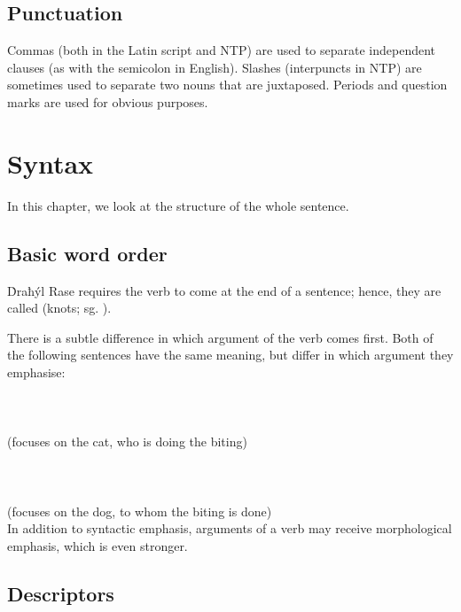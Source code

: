 \documentclass{book}
\begin{document}
\section{Punctuation}

Commas (both in the Latin script and NTP) are used to separate independent clauses (as with the semicolon in English). Slashes (interpuncts in  NTP) are sometimes used to separate two nouns that are juxtaposed. Periods and question marks are used for obvious purposes.

\chapter{Syntax}

In this chapter, we look at the structure of the whole sentence.

\section{Basic word order}

Ḋraħýl Rase requires the verb to come at the end of a sentence; hence, they are called  (knots; sg. ).

There is a subtle difference in which argument of the verb comes first. Both of the following sentences have the same meaning, but differ in which argument they emphasise: \\
~\\
   \\
   \\
\emph{  } (focuses on the cat, who is doing the biting) \\
~\\
   \\
   \\
\emph{  } (focuses on the dog, to whom the biting is done) \\

In addition to syntactic emphasis, arguments of a verb may receive morphological emphasis, which is even stronger.

\section{Descriptors}
\end{document}
